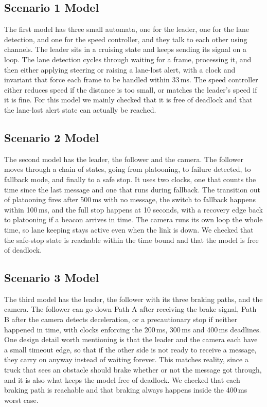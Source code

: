 \documentclass[english]{lni}
\begin{document}
\subsection{Scenario 1 Model}
The first model has three small automata, one for the leader, one for the lane detection, and one for the speed controller, and they talk to each other using channels. The leader sits in a cruising state and keeps sending its signal on a loop. The lane detection cycles through waiting for a frame, processing it, and then either applying steering or raising a lane-lost alert, with a clock and invariant that force each frame to be handled within 33\,ms. The speed controller either reduces speed if the distance is too small, or matches the leader's speed if it is fine. For this model we mainly checked that it is free of deadlock and that the lane-lost alert state can actually be reached.

\subsection{Scenario 2 Model}
The second model has the leader, the follower and the camera. The follower moves through a chain of states, going from platooning, to failure detected, to fallback mode, and finally to a safe stop. It uses two clocks, one that counts the time since the last message and one that runs during fallback. The transition out of platooning fires after 500\,ms with no message, the switch to fallback happens within 100\,ms, and the full stop happens at 10 seconds, with a recovery edge back to platooning if a beacon arrives in time. The camera runs its own loop the whole time, so lane keeping stays active even when the link is down. We checked that the safe-stop state is reachable within the time bound and that the model is free of deadlock.

\subsection{Scenario 3 Model}
The third model has the leader, the follower with its three braking paths, and the camera. The follower can go down Path A after receiving the brake signal, Path B after the camera detects deceleration, or a precautionary stop if neither happened in time, with clocks enforcing the 200\,ms, 300\,ms and 400\,ms deadlines. One design detail worth mentioning is that the leader and the camera each have a small timeout edge, so that if the other side is not ready to receive a message, they carry on anyway instead of waiting forever. This matches reality, since a truck that sees an obstacle should brake whether or not the message got through, and it is also what keeps the model free of deadlock. We checked that each braking path is reachable and that braking always happens inside the 400\,ms worst case.
\end{document}
